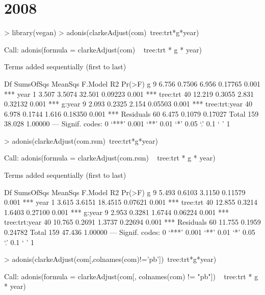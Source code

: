 \documentclass[12pt]{article}
\begin{document}
\section{2008}


\begin{Schunk}
\begin{Sinput}
>   library(vegan)
> adonis(clarkeAdjust(com)~tree:trt*g*year)
\end{Sinput}
\begin{Soutput}
Call:
adonis(formula = clarkeAdjust(com) ~ tree:trt * g * year) 

Terms added sequentially (first to last)

               Df SumsOfSqs MeanSqs F.Model      R2 Pr(>F)    
g               9     6.756  0.7506   6.956 0.17765  0.001 ***
year            1     3.507  3.5074  32.501 0.09223  0.001 ***
tree:trt       40    12.219  0.3055   2.831 0.32132  0.001 ***
g:year          9     2.093  0.2325   2.154 0.05503  0.001 ***
tree:trt:year  40     6.978  0.1744   1.616 0.18350  0.001 ***
Residuals      60     6.475  0.1079         0.17027           
Total         159    38.028                 1.00000           
---
Signif. codes:  0 ‘***’ 0.001 ‘**’ 0.01 ‘*’ 0.05 ‘.’ 0.1 ‘ ’ 1 
\end{Soutput}
\begin{Sinput}
> adonis(clarkeAdjust(com.rsm)~tree:trt*g*year)
\end{Sinput}
\begin{Soutput}
Call:
adonis(formula = clarkeAdjust(com.rsm) ~ tree:trt * g * year) 

Terms added sequentially (first to last)

               Df SumsOfSqs MeanSqs F.Model      R2 Pr(>F)    
g               9     5.493  0.6103  3.1150 0.11579  0.001 ***
year            1     3.615  3.6151 18.4515 0.07621  0.001 ***
tree:trt       40    12.855  0.3214  1.6403 0.27100  0.001 ***
g:year          9     2.953  0.3281  1.6744 0.06224  0.001 ***
tree:trt:year  40    10.765  0.2691  1.3737 0.22694  0.001 ***
Residuals      60    11.755  0.1959         0.24782           
Total         159    47.436                 1.00000           
---
Signif. codes:  0 ‘***’ 0.001 ‘**’ 0.01 ‘*’ 0.05 ‘.’ 0.1 ‘ ’ 1 
\end{Soutput}
\begin{Sinput}
> adonis(clarkeAdjust(com[,colnames(com)!='pb'])~tree:trt*g*year)
\end{Sinput}
\begin{Soutput}
Call:
adonis(formula = clarkeAdjust(com[, colnames(com) != "pb"]) ~      tree:trt * g * year) 


\end{Soutput}
\end{Schunk}
\end{document}
